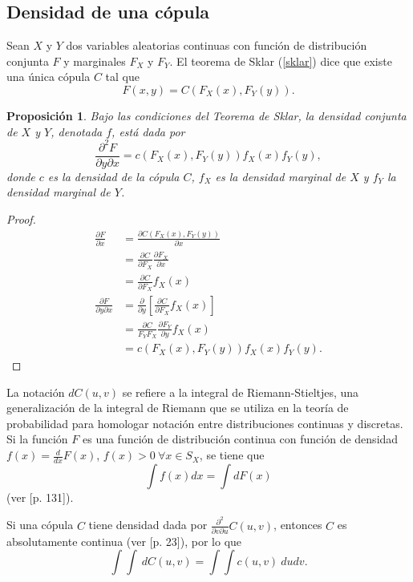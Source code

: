 \documentclass[11pt,a4paper]{article}
\newtheorem{proposition}{Proposición}[subsection]
\begin{document}
\appendixtitleon
\appendixtitletocon
\begin{appendices}
\section{Densidad de una cópula} \label{densidad_copula}

Sean $X$ y $Y$ dos variables aleatorias continuas con función de distribución conjunta $F$ y marginales $F_X$ y $F_Y$. El teorema de Sklar (\ref{sklar}) dice que existe una única cópula $C$ tal que $$F(x, y) = C(F_X(x), F_Y(y)).$$

\begin{proposition}
Bajo las condiciones del Teorema de Sklar, la densidad conjunta de $X$ y $Y$, denotada $f$, está dada por $$\frac{\partial^2 F}{\partial y \partial x} = c(F_X(x), F_Y(y))f_X(x)f_Y(y),$$ donde $c$ es la densidad de la cópula $C$, $f_X$ es la densidad marginal de $X$ y $f_Y$ la densidad marginal de $Y$.
\end{proposition} 

\begin{proof}
\begin{align*}
\frac{\partial F}{\partial x} &= \frac{\partial C(F_X(x), F_Y(y))}{\partial x}\\
&= \frac{\partial C}{\partial F_X} \frac{\partial F_X}{\partial x}\\
&= \frac{\partial C}{\partial F_X}f_X(x)\\
\frac{\partial F}{\partial y \partial x} &= \frac{\partial}{\partial y} \left[\frac{\partial C}{\partial F_X}f_X(x)\right]\\
&= \frac{\partial C}{F_Y F_X}\frac{\partial F_Y}{\partial y}f_X(x)\\
&= c (F_X(x), F_Y(y)) f_X(x) f_Y(y).
\end{align*}
\end{proof}

La notación $dC(u, v)$ se refiere a la integral de Riemann-Stieltjes, una generalización de la integral de Riemann que se utiliza en la teoría de probabilidad para homologar notación entre distribuciones continuas y discretas. Si la función $F$ es una función de distribución continua con función de densidad $f(x) = \frac{d}{dx}F(x)$, $f(x) > 0 \ \forall x \in S_X$, se tiene que $$\int f(x) dx = \int dF(x)$$ (ver \citet{rudin}[p. 131]).

Si una cópula $C$ tiene densidad dada por $\frac{\partial ^2}{\partial v \partial u} C(u, v)$, entonces $C$ es absolutamente continua (ver \citet{nelsen}[p. 23]), por lo que $$\int\int \ dC(u,v) = \int\int  c(u, v) \ dudv.$$


\end{appendices}
\end{document}

